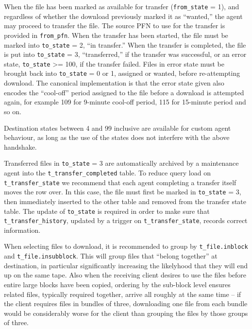 \documentclass{cmspaper}
\begin{document}
When the file has been marked as available for transfer (\texttt{from\_state} = 1), and regardless of whether the download previously marked it as ``wanted,'' the agent may proceed to transfer the file.  The source PFN to use for the transfer is provided in \texttt{from\_pfn}.  When the transfer has been started, the file must be marked into \texttt{to\_state} = 2, ``in transfer.''  When the transfer is completed, the file is put into \texttt{to\_state} = 3, ``transferred,'' if the transfer was successful, or an error state, \texttt{to\_state} >= 100, if the transfer failed.  Files in error state must be brought back into \texttt{to\_state} = 0 or 1, assigned or wanted, before re-attempting download.  The canonical implementation is that the error state given also encodes the ``cool-off'' period assigned to the file before a download is attempted again, for example 109 for 9-minute cool-off period, 115 for 15-minute period and so on.

Destination states between 4 and 99 inclusive are available for custom agent behaviour, as long as the use of the states does not interfere with the above handshake.

Transferred files in \texttt{to\_state} = 3 are automatically archived by a maintenance agent into the \texttt{t\_transfer\_completed} table.  To reduce query load on \texttt{t\_transfer\_state} we recommend that each agent completing a transfer itself moves the row over.  In this case, the file must first be marked in \texttt{to\_state} = 3, then immediately inserted to the other table and removed from the transfer state table.  The update of \texttt{to\_state} is required in order to make sure that \texttt{t\_transfer\_history}, updated by a trigger on \texttt{t\_transfer\_state}, records correct information.

When selecting files to download, it is recommended to group by \texttt{t\_file.inblock} and \texttt{t\_file.insubblock}.  This will group files that ``belong together'' at destination, in particular significantly increasing the likelyhood that they will end up on the same tape.  Also when the receiving client desires to use the files before entire large blocks have been copied, ordering by the sub-block level ensures related files, typically required together, arrive all roughly at the same time -- if the client requires files in bundles of three, downloading one file from each bundle would be considerably worse for the client than grouping the files by those groups of three.
\end{document}

